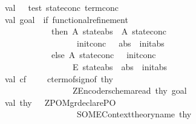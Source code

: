 \begin{isabellebody}
\ \ \ \ \ \ \ \ \ \ \ val\ {\isacharunderscore}\ {\isacharequal}\ test\ state{\isacharunderscore}conc\ term{\isacharunderscore}conc\isanewline
\ \ \ \ \ \ \ \ \ \ \ val\ goal\ {\isacharequal}\ if\ functional{\isacharunderscore}refinement\ \isanewline
\ \ \ \ \ \ \ \ \ \ \ \ \ \ \ \ \ \ \ \ \ \ then\ {\isachardoublequote}{\isacharpercent}A\ {\isachardoublequote}{\isacharcircum}state{\isacharunderscore}abs{\isacharcircum}{\isachardoublequote}\ {\isacharat}\ {\isacharparenleft}{\isacharpercent}A\ {\isachardoublequote}{\isacharcircum}state{\isacharunderscore}conc{\isacharcircum}{\isachardoublequote}\ {\isacharat}\ {\isacharparenleft}{\isachardoublequote}\isanewline
\ \ \ \ \ \ \ \ \ \ \ \ \ \ \ \ \ \ \ \ \ \ \ \ \ \ \ {\isacharcircum}\ init{\isacharunderscore}conc\ {\isacharcircum}{\isachardoublequote}\ {\isacharampersand}\ {\isachardoublequote}{\isacharcircum}abs{\isacharcircum}{\isachardoublequote}\ {\isacharminus}{\isacharminus}{\isachargreater}\ {\isachardoublequote}{\isacharcircum}init{\isacharunderscore}abs{\isacharcircum}{\isachardoublequote}{\isacharparenright}{\isacharparenright}{\isachardoublequote}\isanewline
\ \ \ \ \ \ \ \ \ \ \ \ \ \ \ \ \ \ \ \ \ \ else\ {\isachardoublequote}{\isacharpercent}A\ {\isachardoublequote}{\isacharcircum}state{\isacharunderscore}conc{\isacharcircum}{\isachardoublequote}\ {\isacharat}\ {\isacharparenleft}{\isachardoublequote}{\isacharcircum}\ init{\isacharunderscore}conc\ {\isacharcircum}{\isachardoublequote}\ {\isacharminus}{\isacharminus}{\isachargreater}\ {\isachardoublequote}{\isacharcircum}\isanewline
\ \ \ \ \ \ \ \ \ \ \ \ \ \ \ \ \ \ \ \ \ \ \ \ \ \ \ {\isachardoublequote}{\isacharparenleft}{\isacharpercent}E\ {\isachardoublequote}{\isacharcircum}state{\isacharunderscore}abs{\isacharcircum}{\isachardoublequote}\ {\isacharat}\ {\isacharparenleft}{\isachardoublequote}{\isacharcircum}abs{\isacharcircum}{\isachardoublequote}\ {\isacharampersand}\ {\isachardoublequote}{\isacharcircum}init{\isacharunderscore}abs{\isacharcircum}{\isachardoublequote}{\isacharparenright}{\isacharparenright}{\isacharparenright}{\isachardoublequote}\isanewline
\ \ \ \ \ \ \ \ \ \ \ val\ cf\ \ \ {\isacharequal}\ \ cterm{\isacharunderscore}of{\isacharparenleft}sign{\isacharunderscore}of\ thy{\isacharparenright}\isanewline
\ \ \ \ \ \ \ \ \ \ \ \ \ \ \ \ \ \ \ \ \ \ \ \ \ \ \ {\isacharparenleft}ZEncoder{\isachardot}schema{\isacharunderscore}read\ thy\ goal{\isacharparenright}\isanewline
\ \ \ \ \ \ \ \ \ \ \ val\ thy{\isacharprime}\ {\isacharequal}\ \ ZPO{\isacharunderscore}Mgr{\isachardot}declare{\isacharunderscore}PO\ \isanewline
\ \ \ \ \ \ \ \ \ \ \ \ \ \ \ \ \ \ \ \ \ \ \ \ \ \ \ \ {\isacharparenleft}SOME{\isacharparenleft}Context{\isachardot}theory{\isacharunderscore}name\ thy{\isacharparenright}{\isacharcomma}\isanewline

\end{isabellebody}
